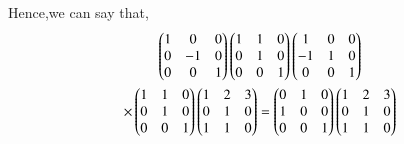  Hence,we can say that,
\begin{multline}
  \myvec{1&0&0\\0&-1&0\\0&0&1} \myvec{1&1&0\\0&1&0\\0&0&1}\myvec{1&0&0\\-1&1&0\\0&0&1}
\\
\times \myvec{1&1&0\\0&1&0\\0&0&1}\myvec{1&2&3\\0&1&0\\1&1&0}= \myvec{0&1&0\\1&0&0\\0&0&1}\myvec{1&2&3\\0&1&0\\1&1&0}
 \end{multline}
